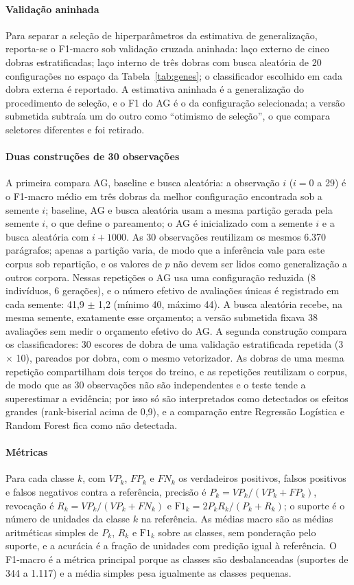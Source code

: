 \documentclass[fleqn,10pt]{SelfArx}
\begin{document}
\paragraph{Validação aninhada} Para separar a seleção de hiperparâmetros da estimativa de generalização, reporta-se o F1-macro sob validação cruzada aninhada: laço externo de cinco dobras estratificadas; laço interno de três dobras com busca aleatória de 20 configurações no espaço da Tabela~\ref{tab:genes}; o classificador escolhido em cada dobra externa é reportado. A estimativa aninhada é a generalização do procedimento de seleção, e o F1 do AG é o da configuração selecionada; a versão submetida subtraía um do outro como ``otimismo de seleção'', o que compara seletores diferentes e foi retirado.

\paragraph{Duas construções de 30 observações} A primeira compara AG, baseline e busca aleatória: a observação $i$ ($i = 0$ a 29) é o F1-macro médio em três dobras da melhor configuração encontrada sob a semente $i$; baseline, AG e busca aleatória usam a mesma partição gerada pela semente $i$, o que define o pareamento; o AG é inicializado com a semente $i$ e a busca aleatória com $i + 1000$. As 30 observações reutilizam os mesmos 6.370 parágrafos; apenas a partição varia, de modo que a inferência vale para este corpus sob repartição, e os valores de $p$ não devem ser lidos como generalização a outros corpora. Nessas repetições o AG usa uma configuração reduzida (8 indivíduos, 6 gerações), e o número efetivo de avaliações únicas é registrado em cada semente: 41,9 $\pm$ 1,2 (mínimo 40, máximo 44). A busca aleatória recebe, na mesma semente, exatamente esse orçamento; a versão submetida fixava 38 avaliações sem medir o orçamento efetivo do AG. A segunda construção compara os classificadores: 30 escores de dobra de uma validação estratificada repetida (3 $\times$ 10), pareados por dobra, com o mesmo vetorizador. As dobras de uma mesma repetição compartilham dois terços do treino, e as repetições reutilizam o corpus, de modo que as 30 observações não são independentes e o teste tende a superestimar a evidência; por isso só são interpretados como detectados os efeitos grandes (rank-biserial acima de 0,9), e a comparação entre Regressão Logística e Random Forest fica como não detectada.

\paragraph{Métricas} Para cada classe $k$, com $VP_k$, $FP_k$ e $FN_k$ os verdadeiros positivos, falsos positivos e falsos negativos contra a referência, precisão é $P_k = VP_k/(VP_k + FP_k)$, revocação é $R_k = VP_k/(VP_k + FN_k)$ e $\mathrm{F1}_k = 2P_kR_k/(P_k + R_k)$; o suporte é o número de unidades da classe $k$ na referência. As médias macro são as médias aritméticas simples de $P_k$, $R_k$ e $\mathrm{F1}_k$ sobre as classes, sem ponderação pelo suporte, e a acurácia é a fração de unidades com predição igual à referência. O F1-macro é a métrica principal porque as classes são desbalanceadas (suportes de 344 a 1.117) e a média simples pesa igualmente as classes pequenas.
\end{document}
